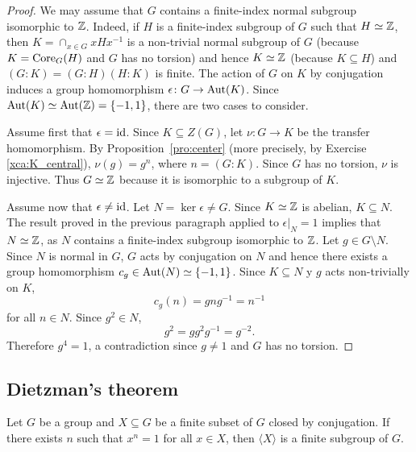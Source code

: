 \begin{proof}
	We may assume that $G$ contains a finite-index normal subgroup isomorphic to $\mathbb{Z}$. Indeed, 
	if $H$ is a finite-index subgroup of $G$ such that $H\simeq\mathbb{Z}$, then 
	$K=\cap_{x\in G}xHx^{-1}$ is a non-trivial normal subgroup of $G$ (because $K=\operatorname{Core}_G(H)$ and 
	$G$ has no torsion) and hence $K\simeq\mathbb{Z}$ (because  
	$K\subseteq H$) and $(G:K)=(G:H)(H:K)$ is finite.
	The action of $G$ on $K$ by conjugation induces a group homomorphism  
	$\epsilon\colon G\to\operatorname{Aut}(K)$. Since $\operatorname{Aut}(K)\simeq\operatorname{Aut}(\mathbb{Z})=\{-1,1\}$, 
	there are two cases to consider.
	
	Assume first that $\epsilon=\operatorname{id}$. Since $K\subseteq Z(G)$, let
	$\nu\colon G\to K$ be the transfer homomorphism. By
	Proposition~\ref{pro:center} (more precisely, 
	by Exercise \ref{xca:K_central}), $\nu(g)=g^n$, where $n=(G:K)$. Since
	$G$ has no torsion, $\nu$ is injective. Thus
	$G\simeq\mathbb{Z}$ because it is isomorphic to a subgroup of $K$.

	Assume now that $\epsilon\ne\operatorname{id}$. Let $N=\ker\epsilon\ne G$. Since
	$K\simeq\mathbb{Z}$ is abelian, $K\subseteq N$. The result proved in the previous paragraph 
	applied to $\epsilon|_N=1$ implies that $N\simeq\mathbb{Z}$, as 
	$N$ contains a finite-index subgroup isomorphic to $\mathbb{Z}$. Let $g\in G\setminus N$. 
	Since $N$ is normal in $G$, $G$ acts by conjugation on $N$ and hence 
	there exists a group homomorphism $c_g\in\operatorname{Aut}(N)\simeq\{-1,1\}$. Since
	$K\subseteq N$ y $g$ acts non-trivially on $K$, 
	\[
	c_g(n)=gng^{-1}=n^{-1}
	\]
	for all $n\in N$.  Since 
	$g^2\in N$, 
	\[
		g^2=gg^2g^{-1}=g^{-2}.
	\]
	Therefore $g^4=1$, a contradiction since $g\ne1$ and $G$ has no torsion.
\end{proof}

\subsection{Dietzman's theorem}

\begin{theorem}[Dietzmann]
	\label{thm:Dietzmann} 
	Let $G$ be a group and $X\subseteq G$ be a finite subset of $G$ closed by
	conjugation. If there exists $n$ such that $x^n=1$ for all $x\in X$, then
	$\langle X\rangle$ is a finite subgroup of $G$.
\end{theorem}

